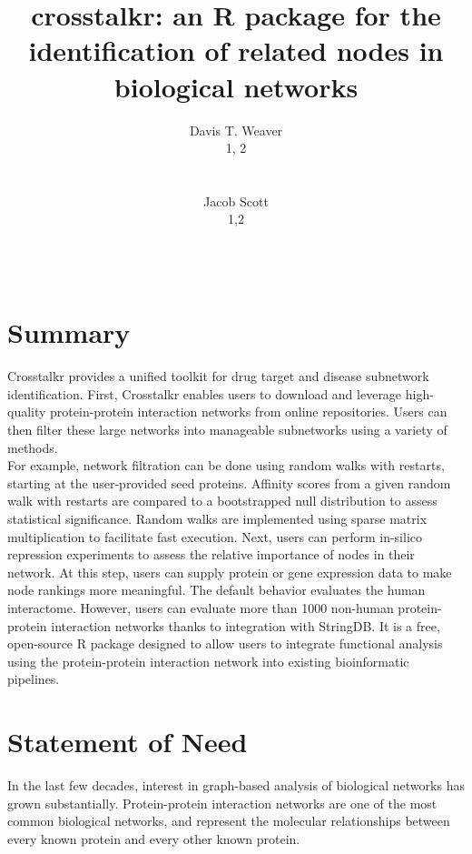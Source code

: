 \documentclass{article}
\title{crosstalkr: an R package for the identification of related nodes
in biological networks}
\author{
    Davis T. Weaver
   \\
    1, 2 \\
   \\
  \texttt{} \\
   \And
    Jacob Scott
   \\
    1,2 \\
   \\
  \texttt{} \\
  }
\begin{document}
\maketitle


\begin{abstract}

\end{abstract}


\hypertarget{summary}{%
\section{Summary}\label{summary}}

Crosstalkr provides a unified toolkit for drug target and disease
subnetwork identification. First, Crosstalkr enables users to download
and leverage high-quality protein-protein interaction networks from
online repositories. Users can then filter these large networks into
manageable subnetworks using a variety of methods.\\
For example, network filtration can be done using random walks with
restarts, starting at the user-provided seed proteins. Affinity scores
from a given random walk with restarts are compared to a bootstrapped
null distribution to assess statistical significance. Random walks are
implemented using sparse matrix multiplication to facilitate fast
execution. Next, users can perform in-silico repression experiments to
assess the relative importance of nodes in their network. At this step,
users can supply protein or gene expression data to make node rankings
more meaningful. The default behavior evaluates the human interactome.
However, users can evaluate more than 1000 non-human protein-protein
interaction networks thanks to integration with StringDB. It is a free,
open-source R package designed to allow users to integrate functional
analysis using the protein-protein interaction network into existing
bioinformatic pipelines.

\hypertarget{statement-of-need}{%
\section{Statement of Need}\label{statement-of-need}}

In the last few decades, interest in graph-based analysis of biological
networks has grown substantially. Protein-protein interaction networks
are one of the most common biological networks, and represent the
molecular relationships between every known protein and every other
known protein.
\end{document}
